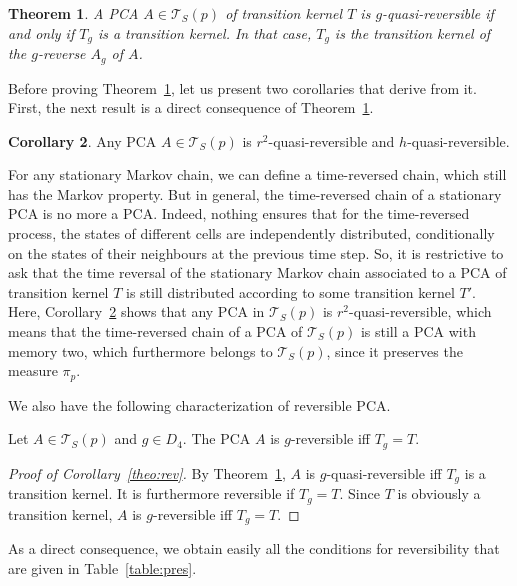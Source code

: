 \documentclass[10pt]{amsart}
\newtheorem{theo}{Theorem}[section]
\theoremstyle{definition}\newtheorem{defi}[theo]{Definition}\newtheorem{rema}[theo]{Remark}\newtheorem{exam}[theo]{Example}\newtheorem{exem}[theo]{Example}\newtheorem{nota}[theo]{Notation}
\newcounter{a}
\newcommand{\triang}[2]{\mathcal{T}_{#1} \left(#2 \right)}
\newtheorem{corollary}[theo]{Corollary}
\begin{document}
\begin{theo}\label{theo:referee}
A PCA $A \in \triang{S}{p}$ of transition kernel $T$ is $g$-quasi-reversible if and only if $T_g$ is a transition kernel. In that case, $T_g$ is the transition kernel of the $g$-reverse $A_g$ of $A$.
\end{theo}

Before proving Theorem~\ref{theo:referee}, let us present two corollaries that derive from it. First, the next result is a direct consequence of Theorem~\ref{theo:referee}.

\begin{corollary}\label{cor:reversibility}
Any PCA $A \in \triang{S}{p}$ is $r^2$-quasi-reversible and $h$-quasi-reversible.
\end{corollary}

For any stationary Markov chain, we can define a time-reversed chain, which still has the Markov property. But in general, the time-reversed chain of a stationary PCA is no more a PCA. Indeed, nothing ensures that for the time-reversed process, the states of different cells are independently distributed, conditionally on the states of their neighbours at the previous time step. So, it is restrictive to ask that the time reversal of the stationary Markov chain associated to a PCA of transition kernel $T$ is still distributed according to some transition kernel $T'$. Here, Corollary~\ref{cor:reversibility} shows that any PCA in $\triang{S}{p}$ is $r^2$-quasi-reversible, which means that the time-reversed chain of a PCA of $\triang{S}{p}$ is still a PCA with memory two, which furthermore belongs to $\triang{S}{p}$, since it preserves the measure $\pi_p$.

We also have the following characterization of reversible PCA.

\begin{coro}\label{theo:rev}
Let $A \in \triang{S}{p}$ and $g\in D_4$. The PCA $A$ is $g$-reversible iff $T_g=T$.
\end{coro}

\begin{proof}[Proof of Corollary~\ref{theo:rev}]
By Theorem~\ref{theo:referee}, $A$ is $g$-quasi-reversible iff $T_g$ is a transition kernel. It is furthermore reversible if $T_g=T$. Since $T$ is obviously a transition kernel, $A$ is $g$-reversible iff $T_g=T$.
\end{proof}

As a direct consequence, we obtain easily all the conditions for reversibility that are given in Table~\ref{table:pres}.
\end{document}

